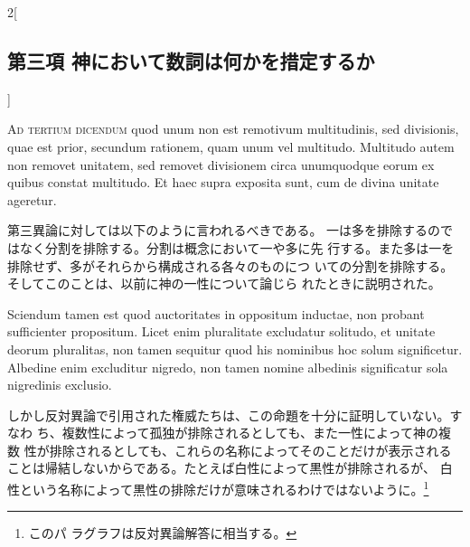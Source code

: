\documentclass[paper=a4paper,fontsize=10pt,jafontsize=9pt,titlepage]{jlreq}
\begin{document}
\begin{paracol}{2}[\subsection{第三項 神において数詞は何かを措定するか}]
\switchcolumn*[\subsection{ad.3}]


{\scshape Ad tertium dicendum} quod unum non est remotivum multitudinis, sed
divisionis, quae est prior, secundum rationem, quam unum vel
multitudo. Multitudo autem non removet unitatem, sed removet
divisionem circa unumquodque eorum ex quibus constat multitudo. Et
haec supra exposita sunt, cum de divina unitate ageretur.


\switchcolumn


第三異論に対しては以下のように言われるべきである。
一は多を排除するのではなく分割を排除する。分割は概念において一や多に先
 行する。また多は一を排除せず、多がそれらから構成される各々のものにつ
 いての分割を排除する。そしてこのことは、以前に神の一性について論じら
 れたときに説明された。


\switchcolumn*


Sciendum
tamen est quod auctoritates in oppositum inductae, non probant
sufficienter propositum. Licet enim pluralitate excludatur solitudo,
et unitate deorum pluralitas, non tamen sequitur quod his nominibus
hoc solum significetur. Albedine enim excluditur nigredo, non tamen
nomine albedinis significatur sola nigredinis exclusio.


\switchcolumn


しかし反対異論で引用された権威たちは、この命題を十分に証明していない。すなわ
 ち、複数性によって孤独が排除されるとしても、また一性によって神の複数
 性が排除されるとしても、これらの名称によってそのことだけが表示される
 ことは帰結しないからである。たとえば白性によって黒性が排除されるが、
 白性という名称によって黒性の排除だけが意味されるわけではないように。\footnote{このパ
 ラグラフは反対異論解答に相当する。}


\switchcolumn*



\end{paracol}
\newpage





\end{document}
